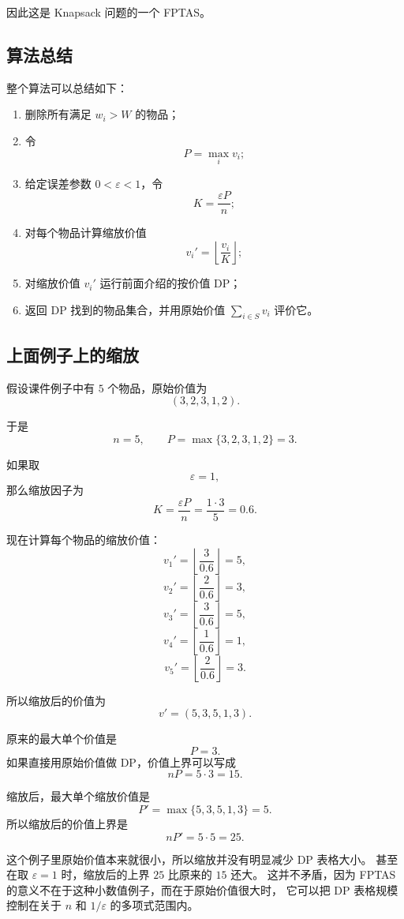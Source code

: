 \documentclass[UTF8,openany,12pt]{ctexbook}
\theoremstyle{remark}
\begin{document}
因此这是 Knapsack 问题的一个 FPTAS。

\subsection{算法总结}

整个算法可以总结如下：

\begin{enumerate}
  \item 删除所有满足 $w_i>W$ 的物品；
  \item 令
  \[
    P=\max_i v_i;
  \]
  \item 给定误差参数 $0<\varepsilon<1$，令
  \[
    K=\frac{\varepsilon P}{n};
  \]
  \item 对每个物品计算缩放价值
  \[
    v_i'=\left\lfloor \frac{v_i}{K}\right\rfloor;
  \]
  \item 对缩放价值 $v_i'$ 运行前面介绍的按价值 DP；
  \item 返回 DP 找到的物品集合，并用原始价值 $\sum_{i\in S}v_i$ 评价它。
\end{enumerate}

\subsection{上面例子上的缩放}

假设课件例子中有 $5$ 个物品，原始价值为
\[
  (3,2,3,1,2).
\]

于是
\[
  n=5,
  \qquad
  P=\max\{3,2,3,1,2\}=3.
\]

如果取
\[
  \varepsilon=1,
\]
那么缩放因子为
\[
  K=\frac{\varepsilon P}{n}
  =
  \frac{1\cdot 3}{5}
  =
  0.6.
\]

现在计算每个物品的缩放价值：
\[
  v_1'
  =
  \left\lfloor \frac{3}{0.6}\right\rfloor
  =
  5,
\]
\[
  v_2'
  =
  \left\lfloor \frac{2}{0.6}\right\rfloor
  =
  3,
\]
\[
  v_3'
  =
  \left\lfloor \frac{3}{0.6}\right\rfloor
  =
  5,
\]
\[
  v_4'
  =
  \left\lfloor \frac{1}{0.6}\right\rfloor
  =
  1,
\]
\[
  v_5'
  =
  \left\lfloor \frac{2}{0.6}\right\rfloor
  =
  3.
\]

所以缩放后的价值为
\[
  v'=(5,3,5,1,3).
\]

原来的最大单个价值是
\[
  P=3.
\]
如果直接用原始价值做 DP，价值上界可以写成
\[
  nP=5\cdot 3=15.
\]

缩放后，最大单个缩放价值是
\[
  P'=\max\{5,3,5,1,3\}=5.
\]
所以缩放后的价值上界是
\[
  nP'=5\cdot 5=25.
\]

这个例子里原始价值本来就很小，所以缩放并没有明显减少 DP 表格大小。
甚至在取 $\varepsilon=1$ 时，缩放后的上界 $25$ 比原来的 $15$ 还大。
这并不矛盾，因为 FPTAS 的意义不在于这种小数值例子，而在于原始价值很大时，
它可以把 DP 表格规模控制在关于 $n$ 和 $1/\varepsilon$ 的多项式范围内。
\end{document}
